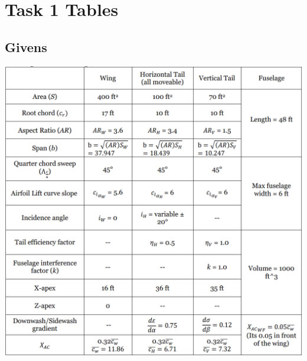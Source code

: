 \documentclass[a4paper, twoside]{article}
\begin{document}
\section{Task 1 Tables}
\subsection*{Givens}
\includegraphics[width=\linewidth]{Givens-table.png}
\pagebreak
\end{document}
